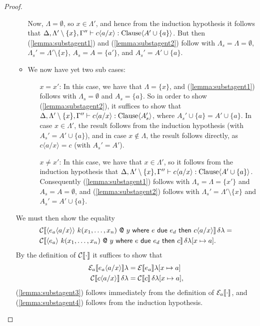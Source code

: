 \documentclass[orivec,final]{llncs-href}
\makeatletter
\newcommand{\catomic}[6]{\langle#1\rangle\ #2\ \textsf{@}\ #3\
  \mathsf{where}\ #4\ \mathsf{due}\ #5\ \mathsf{then}\ #6}
\makeatother
\begin{document}
\begin{proof}
\begin{itemize}[]
\begin{itemize}[]
      Now, $\Lambda = \emptyset$, so $x \in \Lambda'$,
      and hence from the induction hypothesis it follows that
      $\Delta,\Lambda' \setminus \{x\},\Gamma'' \vdash c
        \langle a/x \rangle : \mathrm{Clause} \langle A' \cup \{a\} \rangle$. But then
      (\ref{lemma:substagent1}) and (\ref{lemma:substagent2}) follow
      with $\Lambda_s = \Lambda = \emptyset$, $\Lambda_s' = \Lambda'
      \setminus \{x\}$, $A_s = A = \{a'\}$, and $A_s' = A' \cup \{a\}$.
    \item {}
      
      We now have yet two sub cases:
      \begin{itemize}
      \item[$x = x'$:] In this case, we have that $\Lambda = \{x\}$,
        and (\ref{lemma:substagent1}) follows with $\Lambda_s =
        \emptyset$ and $A_s = \{a\}$. So in order to show
        (\ref{lemma:substagent2}), it suffices to show that
        $\Delta,\Lambda' \setminus \{x\},\Gamma'' \vdash c \langle a/x
          \rangle : \mathrm{Clause} \langle A_s' \rangle$, where $A_s' \cup \{a\} = A' \cup
        \{a\}$. In case $x \in \Lambda'$, the result follows from the
        induction hypothesis (with $A_s' = A' \cup \{a\}$), and in
        case $x \not\in \Lambda$, the result follows directly, as $c
        \langle a/x \rangle = c$ (with $A_s' = A'$). 
      \item[$x \neq x'$:] In this case, we have that $x \in \Lambda'$,
        so it follows from the induction hypothesis that
        $\Delta,\Lambda' \setminus \{x\},\Gamma'' \vdash c
          \langle a/x \rangle : \mathrm{Clause} \langle A' \cup \{a\} \rangle$. Consequently
        (\ref{lemma:substagent1}) follows with $\Lambda_s = \Lambda =
        \{x'\}$ and $A_s = A = \emptyset$, and (\ref{lemma:substagent2})
        follows with $\Lambda_s' = \Lambda' \setminus \{x\}$ and $A_s'
        = A' \cup \{a\}$.
      \end{itemize}
    \end{itemize}

    We must then show the equality
    \begin{align*}
      &\cdenclause{\catomic{e_a \langle a/x
          \rangle}{k(x_1,\ldots,x_n)}{y}{e}{e_d}{c \langle a/x
          \rangle}}{\delta}{\lambda}{}{}{}
      =\\
      &\cdenclause{\catomic{e_a}{k(x_1,\ldots,x_n)}{y}{e}{e_d}{c}}{\delta}{\lambda[x
        \mapsto a]}{}{}{}.
    \end{align*}
    By the definition of $\mathcal{C}\!\left\llbracket \cdot \right\rrbracket    $ it suffices to show that
    \begin{align}
      \mathcal{E}_a\llbracket e_a\langle a/x \rangle \rrbracket \lambda &=
      \mathcal{E}\llbracket e_a \rrbracket \lambda[x \mapsto a]\label{lemma:substagent3}\\
      \mathcal{C}\!\left\llbracket c \langle a/x \rangle \right\rrbracket \delta \lambda  
      &= \mathcal{C}\!\left\llbracket c \right\rrbracket \delta \lambda[x \mapsto
        a]  ,\label{lemma:substagent4}
    \end{align}
    (\ref{lemma:substagent3}) follows immediately from the definition
    of $\mathcal{E}_a\llbracket \cdot \rrbracket$, and (\ref{lemma:substagent4}) follows
    from the induction hypothesis.


\end{itemize}
\end{proof}
\end{document}
